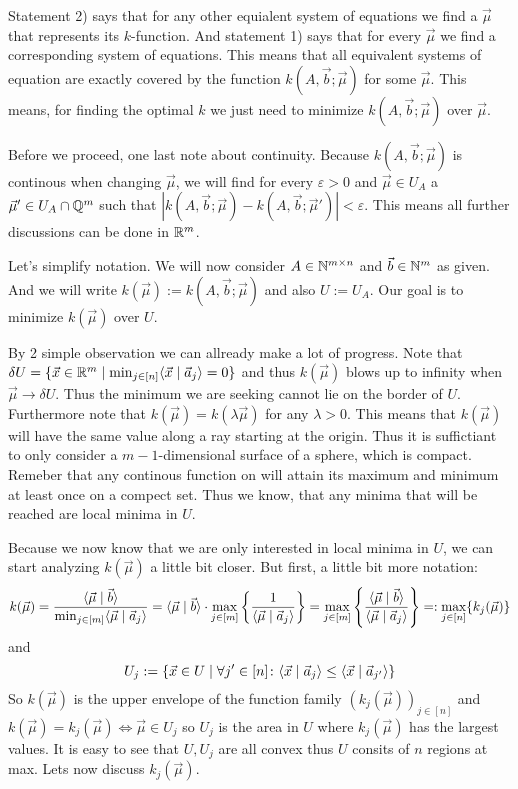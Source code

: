 Statement 2) says that for any other equialent system of equations we find a $\vec \mu$ that represents its $k$-function. And statement 1) says that for every $\vec \mu$ we find a corresponding system of equations. This means that all equivalent systems of equation are exactly covered by the function $k(A, \vec b; \vec\mu)$ for some $\vec \mu$. This means, for finding the optimal $k$ we just need to minimize $k(A, \vec b; \vec \mu)$ over $\vec \mu$.

Before we proceed, one last note about continuity. Because $k(A, \vec b; \vec \mu)$ is continous when changing $\vec\mu$, we will find for every $\varepsilon > 0$ and $\vec\mu \in U_A$ a $\vec\mu' \in U_A \cap \mathbb{Q}^m$ such that $|k(A, \vec b; \vec \mu) - k(A, \vec b; \vec \mu')| < \varepsilon$. This means all further discussions can be done in $\mathbb{R}^m$.

Let's simplify notation. We will now consider $A \in \mathbb{N}^{m \times n}$ and $\vec b \in \mathbb{N}^m$ as given. And we will write $k(\vec \mu) := k(A, \vec b; \vec \mu)$ and also $U := U_A$. Our goal is to minimize $k(\vec \mu)$ over $U$.

By 2 simple observation we can allready make a lot of progress. Note that $\delta U = \{\vec x \in \mathbb{R}^m \mid \min_{j \in [n]}\langle \vec x \mid \vec a_j \rangle = 0\}$ and thus $k(\vec \mu)$ blows up to infinity when $\vec \mu \to \delta U$. Thus the minimum we are seeking cannot lie on the border of $U$. Furthermore note that $k(\vec \mu) = k(\lambda \vec\mu)$ for any $\lambda > 0$. This means that $k(\vec \mu)$ will have the same value along a ray starting at the origin. Thus it is suffictiant to only consider a $m-1$-dimensional surface of a sphere, which is compact. Remeber that any continous function on will attain its maximum and minimum at least once on a compect set. Thus we know, that any minima that will be reached are local minima in $U$.

Because we now know that we are only interested in local minima in $U$, we can start analyzing $k(\vec \mu)$ a little bit closer. But first, a little bit more notation:
$$k(\vec \mu) = \frac{\langle \vec{\mu} \mid \vec b \rangle}{\min_{j \in [m]} \langle \vec \mu \mid \vec a_j \rangle} = \langle \vec{\mu} \mid \vec b \rangle\cdot\max_{j \in [m]}\left\{\frac{1}{\langle \vec \mu \mid \vec a_j \rangle}\right\} = \max_{j \in [m]}\left\{\frac{\langle \vec{\mu} \mid \vec b \rangle}{\langle \vec \mu \mid \vec a_j \rangle}\right\} =: \max_{j\in[n]}\{k_j(\vec \mu)\}$$
and
$$U_j := \{\vec x \in U \mid \forall j' \in [n]\colon \langle \vec x \mid \vec a_j \rangle \leq \langle \vec x \mid \vec a_{j'} \rangle\}$$
So $k(\vec \mu)$ is the upper envelope of the function family $(k_j(\vec \mu))_{j \in [n]}$ and $k(\vec \mu) = k_j(\vec\mu) \Leftrightarrow \vec\mu \in U_j$ so $U_j$ is the area in $U$ where $k_j(\vec\mu)$ has the largest values. It is easy to see that $U, U_j$ are all convex thus $U$ consits of $n$ regions at max. Lets now discuss $k_j(\vec\mu)$.

